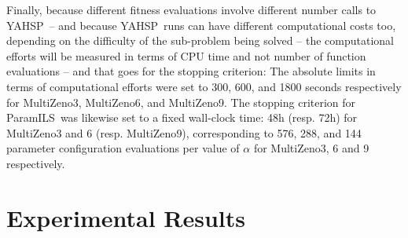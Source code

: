 \documentclass{llncs}
\def\YAHSP{{\sc YAHSP}}
\def\MULTIZENO{{\sc MultiZeno}}
\def\PARAMILS{{\sc ParamILS}}
\begin{document}
Finally, because different fitness evaluations involve different number calls to \YAHSP\ -- and because \YAHSP\ runs can have different computational costs too, depending on the difficulty of the sub-problem being solved -- the computational efforts will be measured in terms of CPU time and not number of function evaluations -- and that goes for the stopping criterion: The absolute limits in terms of computational efforts were set to 300, 600, and 1800 seconds respectively for  \MULTIZENO3,  \MULTIZENO6, and  \MULTIZENO9.
The stopping criterion for \PARAMILS\ was likewise set to a fixed wall-clock time: 48h (resp. 72h) for \MULTIZENO3 and 6 (resp. \MULTIZENO9), corresponding to 576, 288, and 144 parameter configuration evaluations per value  of $\alpha$ for \MULTIZENO3, 6 and 9 respectively.



\section{Experimental Results}
\label{sec:experiments}

\end{document}
